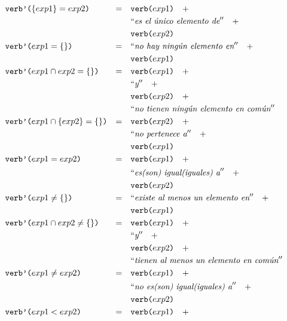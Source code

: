 \begin{align*} 
&\nlgfun{verb'($\{exp1\} = exp2$)} & = \quad & \nlgfun{verb($exp1$)} \quad +  \\
& &											 		& \nlgtext{es el único elemento de} \quad +  \\
& &											 		& \nlgfun{verb($exp2$)} \\
&\nlgfun{verb'($exp1 = \{\}$)} & = \quad & \nlgtext{no hay ningún elemento en}  \quad +  \\
& &											 		& \nlgfun{verb($exp1$)} \\
&\nlgfun{verb'($exp1 \cap exp2 = \{\}$)} & = \quad & \nlgfun{verb($exp1$)} \quad +  \\
& &											 		& \nlgtext{y} \quad +  \\
& &											 		& \nlgfun{verb($exp2$)} \quad +  \\
& &											 		& \nlgtext{no tienen ningún elemento en común} \\
&\nlgfun{verb'($exp1 \cap \{exp2\} = \{\}$)} & = \quad & \nlgfun{verb($exp2$)} \quad +  \\
& &											 		& \nlgtext{no pertenece a} \quad +  \\
& &											 		& \nlgfun{verb($exp1$)} \\
&\nlgfun{verb'($exp1 = exp2$)} & = \quad & \nlgfun{verb($exp1$)} \quad +  \\
& &											 		& \nlgtext{es(son) igual(iguales) a} \quad +  \\
& &											 		& \nlgfun{verb($exp2$)} \\
&\nlgfun{verb'($exp1 \neq \{\}$)} & = \quad & \nlgtext{existe al menos un elemento en} \quad +  \\
& &											 		& \nlgfun{verb($exp1$)} \\
&\nlgfun{verb'($exp1 \cap exp2 \neq \{\}$)} & = \quad & \nlgfun{verb($exp1$)} \quad +  \\
& &											 		& \nlgtext{y} \quad +  \\
& &											 		& \nlgfun{verb($exp2$)} \quad +  \\
& &											 		& \nlgtext{tienen al menos un elemento en común} \\
&\nlgfun{verb'($exp1 \neq exp2$)} & = \quad & \nlgfun{verb($exp1$)} \quad +  \\
& &											 		& \nlgtext{no es(son) igual(iguales) a} \quad +  \\
& &											 		& \nlgfun{verb($exp2$)} \\
&\nlgfun{verb'($exp1 < exp2$)} & = \quad & \nlgfun{verb($exp1$)} \quad +  \\

\end{align*}
